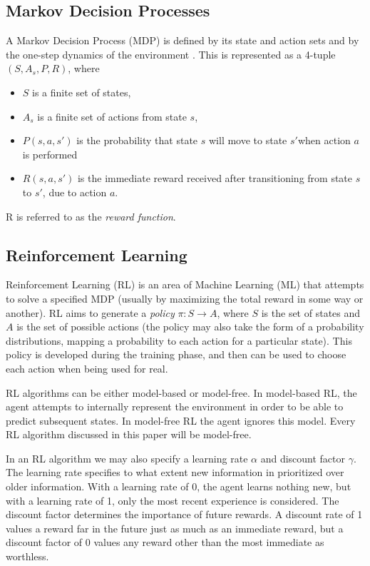 \newtheorem{definition}{Definition}[subsection]


\subsection{Markov Decision Processes}
A Markov Decision Process (MDP) is defined by its state and action sets and by the one-step dynamics of the environment \cite{RLAnIntro}. This is represented as a 4-tuple $(S, A_{s}, P, R)$, where
\begin{itemize}
  \item $S$ is a finite set of states,
  \item $A_{s}$ is a finite set of actions from state $s$,
  \item $P(s, a, s')$ is the probability that state $s$ will move to state $s'$when action $a$ is performed
  \item $R(s, a, s')$ is the immediate reward received after transitioning from state $s$ to $s'$, due to action $a$.
\end{itemize}
R is referred to as the \textit{reward function}.



\subsection{Reinforcement Learning}
Reinforcement Learning (RL) is an area of Machine Learning (ML) that attempts to solve a specified MDP (usually by maximizing the total reward in some way or another). RL aims to generate a \textit{policy} $\pi : S \to A$, where $S$ is the set of states and $A$ is the set of possible actions (the policy may also take the form of a probability distributions, mapping a probability to each action for a particular state). This policy is developed during the training phase, and then can be used to choose each action when being used for real.

RL algorithms can be either model-based or model-free. In model-based RL, the agent attempts to internally represent the environment in order to be able to predict subsequent states. In model-free RL the agent ignores this model. Every RL algorithm discussed in this paper will be model-free.

In an RL algorithm we may also specify a learning rate $\alpha$ and discount factor $\gamma$. The learning rate specifies to what extent new information in prioritized over older information. With a learning rate of 0, the agent learns nothing new, but with a learning rate of 1, only the most recent experience is considered. The discount factor determines the importance of future rewards. A discount rate of 1 values a reward far in the future just as much as an immediate reward, but a discount factor of 0 values any reward other than the most immediate as worthless.



